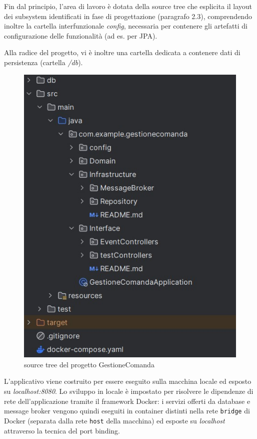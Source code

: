 Fin dal principio, l'area di lavoro è dotata della source tree che esplicita il layout dei subsystem identificati in fase di progettazione (paragrafo 2.3), comprendendo inoltre la cartella interfunzionale \textit{config}, necessaria per contenere gli artefatti di configurazione delle funzionalità (ad es. per JPA).

Alla radice del progetto, vi è inoltre una cartella dedicata a contenere dati di persistenza (cartella \textit{/db}).

\begin{figure}[htbp]
	\centering
	\includegraphics[scale=0.50]{iterazione1/images/source tree.jpg}
	\caption{source tree del progetto GestioneComanda
 \label{fig:srctreeGestioneComanda}}
\end{figure}

L'applicativo viene costruito per essere eseguito sulla macchina locale ed esposto su \textit{localhost:8080}. Lo sviluppo in locale è impostato per risolvere le dipendenze di rete dell'applicazione tramite il framework Docker: i servizi offerti da database e message broker vengono quindi eseguiti in container distinti nella rete \texttt{bridge} di Docker (separata dalla rete \texttt{host} della macchina) ed esposte su \textit{localhost} attraverso la tecnica del port binding.

